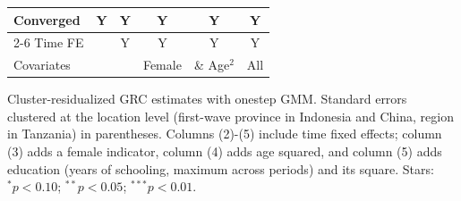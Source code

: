 \begin{table}[htbp]
\begin{threeparttable}
\begin{tabular}{l ccccc}
Converged           &           Y   &           Y   &           Y   &           Y   &           Y   \\
\cmidrule{2-6} Time FE & & Y & Y & Y & Y \\ Covariates & & & Female & \& Age$^2$ & All \\ \bottomrule \end{tabular} \begin{tablenotes}[flushleft] \footnotesize \item{Cluster-residualized GRC estimates with onestep GMM. Standard errors clustered at the location level (first-wave province in Indonesia and China, region in Tanzania) in parentheses. Columns (2)-(5) include time fixed effects; column (3) adds a female indicator, column (4) adds age squared, and column (5) adds education (years of schooling, maximum across periods) and its square. Stars: $^{*} p<0.10$; $^{**} p<0.05$; $^{***} p<0.01$.} \end{tablenotes} \end{threeparttable} \end{table}
